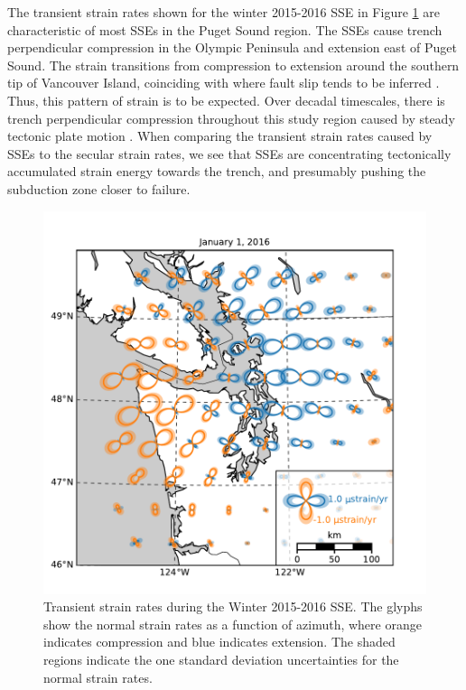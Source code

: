 \documentclass[extra,mreferee]{gji}
\begin{document}

The transient strain rates shown for the winter 2015-2016 SSE in
Figure \ref{fig:StrainMap} are characteristic of most SSEs in the
Puget Sound region. The SSEs cause trench perpendicular compression in
the Olympic Peninsula and extension east of Puget Sound. The strain
transitions from compression to extension around the southern tip of
Vancouver Island, coinciding with where fault slip tends to be
inferred \citep[e.g.,][]{Dragert2001, Wech2009, Schmidt2010}. Thus,
this pattern of strain is to be expected. Over decadal timescales,
there is trench perpendicular compression throughout this study region
caused by steady tectonic plate motion \citep{Murray2000,
McCaffrey2007, McCaffrey2013}. When comparing the transient strain
rates caused by SSEs to the secular strain rates, we see that SSEs are
concentrating tectonically accumulated strain energy towards the
trench, and presumably pushing the subduction zone closer to failure.

\begin{figure}
\includegraphics{figures/strain_map/strain-map.pdf}
\caption{
Transient strain rates during the Winter 2015-2016 SSE. The glyphs
show the normal strain rates as a function of azimuth, where orange
indicates compression and blue indicates extension. The shaded regions
indicate the one standard deviation uncertainties for the normal
strain rates.
}   
\label{fig:StrainMap}
\end{figure}
\end{document}
